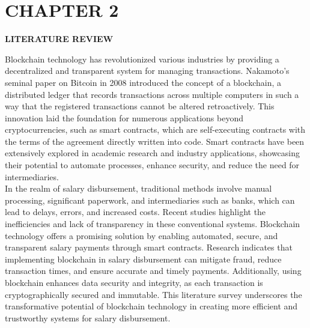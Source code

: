 \documentclass[12pt]{report}
\begin{document}
\section*{CHAPTER 2}
\vspace{1EM}
\begin{center}
    \textbf{\fontsize{16pt}{21.6pt}\selectfont LITERATURE REVIEW}  %
\end{center}
\begin{center}    
    \justify
Blockchain technology has revolutionized various industries by providing a decentralized and transparent system for managing transactions. Nakamoto's seminal paper on Bitcoin in 2008 introduced the concept of a blockchain, a distributed ledger that records transactions across multiple computers in such a way that the registered transactions cannot be altered retroactively. This innovation laid the foundation for numerous applications beyond cryptocurrencies, such as smart contracts, which are self-executing contracts with the terms of the agreement directly written into code. Smart contracts have been extensively explored in academic research and industry applications, showcasing their potential to automate processes, enhance security, and reduce the need for intermediaries. \\
In the realm of salary disbursement, traditional methods involve manual processing, significant paperwork, and intermediaries such as banks, which can lead to delays, errors, and increased costs. Recent studies highlight the inefficiencies and lack of transparency in these conventional systems. Blockchain technology offers a promising solution by enabling automated, secure, and transparent salary payments through smart contracts. Research indicates that implementing blockchain in salary disbursement can mitigate fraud, reduce transaction times, and ensure accurate and timely payments. Additionally, using blockchain enhances data security and integrity, as each transaction is cryptographically secured and immutable. This literature survey underscores the transformative potential of blockchain technology in creating more efficient and trustworthy systems for salary disbursement.
\end{center}
\vspace{0.7em}
\end{document}
